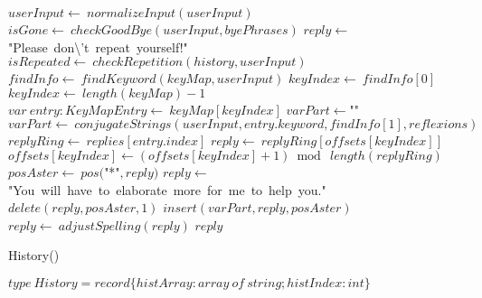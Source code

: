 \documentclass[a4paper,10pt]{article}
\begin{document}
\begin{algorithm}
\begin{algorithmic}[5]
    \STATE {}
    \STATE \(userInput\gets\ normalizeInput(userInput)\)
    \STATE \(isGone\gets\ checkGoodBye(userInput,byePhrases)\)
      \STATE \(reply\gets\)"{}Please\ don\textbackslash{}'{}t\ repeat\ yourself!"{}\(\)
      \STATE \(isRepeated\gets\ checkRepetition(history,userInput)\)
        \STATE \(findInfo\gets\ findKeyword(keyMap,userInput)\)
        \STATE \(keyIndex\gets\ findInfo[0]\)
          \STATE \(keyIndex\gets\ length(keyMap)-1\)
        \ENDIF
        \STATE \(var\ entry:KeyMapEntry\gets\ keyMap[keyIndex]\)
        \STATE \(varPart\gets\)"{}"{}\(\)
          \STATE \(varPart\gets\ conjugateStrings(userInput,entry.keyword,findInfo[1],reflexions)\)
        \ENDIF
        \STATE \(replyRing\gets\ replies[entry.index]\)
        \STATE \(reply\gets\ replyRing[offsets[keyIndex]]\)
        \STATE \(offsets[keyIndex]\gets(offsets[keyIndex]+1)\bmod\ length(replyRing)\)
        \STATE \(posAster\gets\ pos(\)"{}*"{}\(,reply)\)
            \STATE \(reply\gets\)"{}You\ will\ have\ to\ elaborate\ more\ for\ me\ to\ help\ you."{}\(\)
          \ELSE
            \STATE \(delete(reply,posAster,1)\)
            \STATE \(insert(varPart,reply,posAster)\)
          \ENDIF
        \ENDIF
        \STATE \(reply\gets\ adjustSpelling(reply)\)
      \ENDIF
      \PRINT\(reply\)
    \ENDIF

\end{algorithmic}
\end{algorithm}


\begin{algorithm}
\caption{History()}
\begin{algorithmic}[5]

\STATE {}
  \STATE {}
  \STATE {}
  \STATE {}
  \STATE {}
  \STATE {}
  \STATE {}
  \STATE \(type\ History=record\{histArray:array\ of\ string;histIndex:int\}\)

\end{algorithmic}
\end{algorithm}
\end{document}
